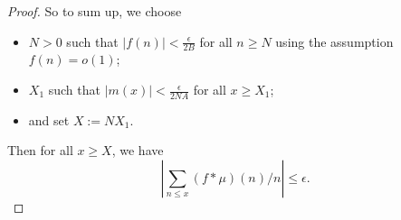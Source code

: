 \documentclass[12pt]{article}
\newcommand{\Abs}[1]{\left| #1 \right|}
\begin{document}
\begin{proof}
So to sum up, we choose
\begin{itemize}
\item $N > 0$ such that $|f(n)| < \frac{\epsilon}{2B}$ for all $n \geq N$ using the assumption $f(n) = o(1)$;
\item $X_1$ such that $|m(x)| < \frac{\epsilon}{2NA}$ for all $x \geq X_1$;
\item and set $X := N X_1$.
\end{itemize}
Then for all $x \geq X$, we have
$$\Abs{ \sum_{n \leq x} (f * \mu)(n) / n } \leq \epsilon.$$
\end{proof}

\unless\ifdefined\IsMainDocument
\end{document}
